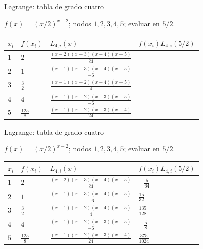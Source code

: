 \documentclass[original_version/main.tex]{subfiles}
\begin{document}
\begin{frame}[t]{Lagrange: tabla de grado cuatro}
\par\noindent\begin{minipage}[t][12mm][t]{\textwidth}\small\strut $f(x)=(x/2)^{x-2}$; nodos $1,2,3,4,5$; evaluar en $5/2$.\end{minipage}\par\nointerlineskip
\begingroup\scriptsize\setlength{\tabcolsep}{3pt}\begin{center}\begin{tabular}{|C{.06\textwidth}|C{.10\textwidth}|C{.48\textwidth}|C{.20\textwidth}|}\hline
\rule[-2mm]{0pt}{6mm}$x_i$&$f(x_i)$&$L_{4,i}(x)$&$f(x_i)L_{4,i}(5/2)$\\\hline
\rule[-2.5mm]{0pt}{7mm}$1$&$2$&$\frac{(x-2)(x-3)(x-4)(x-5)}{24}$&\\\hline
\rule[-2.5mm]{0pt}{7mm}$2$&$1$&$\frac{(x-1)(x-3)(x-4)(x-5)}{-6}$&\\\hline
\rule[-2.5mm]{0pt}{7mm}$3$&$\frac{3}{2}$&$\frac{(x-1)(x-2)(x-4)(x-5)}{4}$&\\\hline
\rule[-2.5mm]{0pt}{7mm}$4$&$4$&$\frac{(x-1)(x-2)(x-3)(x-5)}{-6}$&\\\hline
\rule[-2.5mm]{0pt}{7mm}$5$&$\frac{125}{8}$&$\frac{(x-1)(x-2)(x-3)(x-4)}{24}$&\\\hline
\end{tabular}\end{center}\endgroup\par

\end{frame}
\begin{frame}[t]{Lagrange: tabla de grado cuatro}
\par\noindent\begin{minipage}[t][12mm][t]{\textwidth}\small\strut $f(x)=(x/2)^{x-2}$; nodos $1,2,3,4,5$; evaluar en $5/2$.\end{minipage}\par\nointerlineskip
\begingroup\scriptsize\setlength{\tabcolsep}{3pt}\begin{center}\begin{tabular}{|C{.06\textwidth}|C{.10\textwidth}|C{.48\textwidth}|C{.20\textwidth}|}\hline
\rule[-2mm]{0pt}{6mm}$x_i$&$f(x_i)$&$L_{4,i}(x)$&$f(x_i)L_{4,i}(5/2)$\\\hline
\rule[-2.5mm]{0pt}{7mm}$1$&$2$&$\frac{(x-2)(x-3)(x-4)(x-5)}{24}$&$-\frac{5}{64}$\\\hline
\rule[-2.5mm]{0pt}{7mm}$2$&$1$&$\frac{(x-1)(x-3)(x-4)(x-5)}{-6}$&$\frac{15}{32}$\\\hline
\rule[-2.5mm]{0pt}{7mm}$3$&$\frac{3}{2}$&$\frac{(x-1)(x-2)(x-4)(x-5)}{4}$&$\frac{135}{128}$\\\hline
\rule[-2.5mm]{0pt}{7mm}$4$&$4$&$\frac{(x-1)(x-2)(x-3)(x-5)}{-6}$&$-\frac{5}{8}$\\\hline
\rule[-2.5mm]{0pt}{7mm}$5$&$\frac{125}{8}$&$\frac{(x-1)(x-2)(x-3)(x-4)}{24}$&$\frac{375}{1024}$\\\hline
\end{tabular}\end{center}\endgroup\par

\end{frame}
\end{document}
